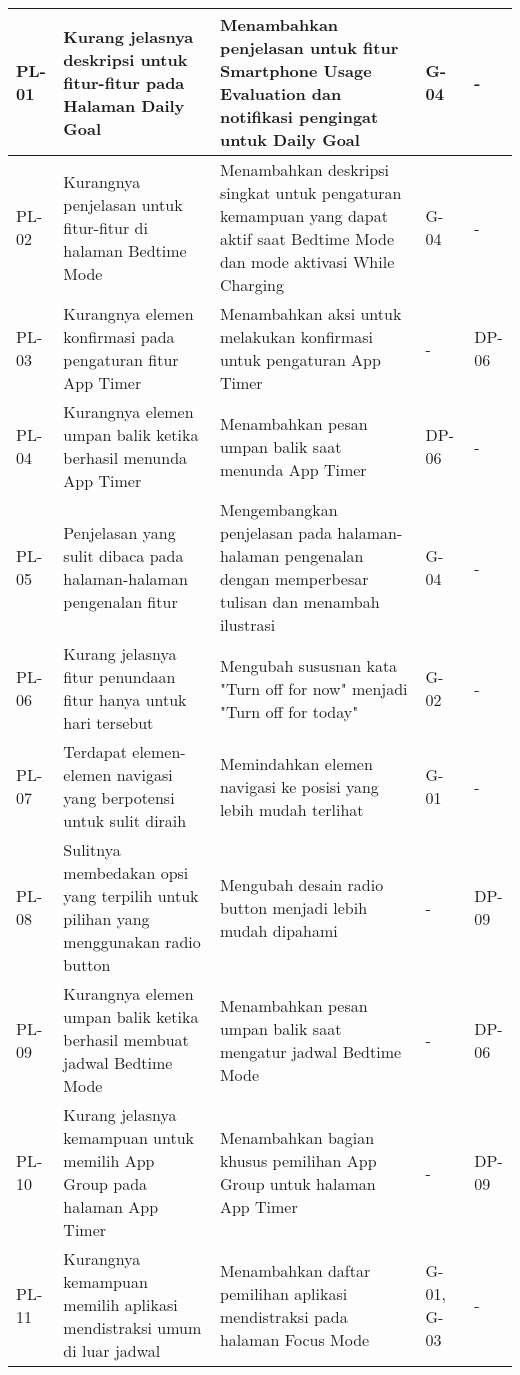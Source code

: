 \begin{footnotesize}
\begin{longtable}[c]{|W{c}{0.06\textwidth}|>{\ccnormspacing}m{0.31\textwidth}|>{\ccnormspacing}m{0.31\textwidth}|>{\ccnormspacingcenter}m{0.07\textwidth}|>{\ccnormspacingcenter}m{0.09\textwidth}|}
  PL-01 & Kurang jelasnya deskripsi untuk fitur-fitur pada Halaman Daily Goal & Menambahkan penjelasan untuk fitur Smartphone Usage Evaluation dan notifikasi pengingat untuk Daily Goal & G-04 & - \\ \hline
  PL-02 & Kurangnya penjelasan untuk fitur-fitur di halaman Bedtime Mode & Menambahkan deskripsi singkat untuk pengaturan kemampuan yang dapat aktif saat Bedtime Mode dan mode aktivasi While Charging & G-04 & - \\ \hline
  PL-03 & Kurangnya elemen konfirmasi pada pengaturan fitur App Timer & Menambahkan aksi untuk melakukan konfirmasi untuk pengaturan App Timer & - & DP-06 \\ \hline
  PL-04 & Kurangnya elemen umpan balik ketika berhasil menunda App Timer & Menambahkan pesan umpan balik saat menunda App Timer & DP-06 & - \\ \hline
  PL-05 & Penjelasan yang sulit dibaca pada halaman-halaman pengenalan fitur & Mengembangkan penjelasan pada halaman-halaman pengenalan dengan memperbesar tulisan dan menambah ilustrasi & G-04 & - \\ \hline
  PL-06 & Kurang jelasnya fitur penundaan fitur hanya untuk hari tersebut & Mengubah sususnan kata "Turn off for now" menjadi "Turn off for today" & G-02 & - \\ \hline
  PL-07 & Terdapat elemen-elemen navigasi yang berpotensi untuk sulit diraih & Memindahkan elemen navigasi ke posisi yang lebih mudah terlihat & G-01 & - \\ \hline
  PL-08 & Sulitnya membedakan opsi yang terpilih untuk pilihan yang menggunakan radio button & Mengubah desain radio button menjadi lebih mudah dipahami & - & DP-09 \\ \hline
  PL-09 & Kurangnya elemen umpan balik ketika berhasil membuat jadwal Bedtime Mode & Menambahkan pesan umpan balik saat mengatur jadwal Bedtime Mode & - & DP-06 \\ \hline
  PL-10 & Kurang jelasnya kemampuan untuk memilih App Group pada halaman App Timer & Menambahkan bagian khusus pemilihan App Group untuk halaman App Timer & - & DP-09 \\ \hline
  PL-11 & Kurangnya kemampuan memilih aplikasi mendistraksi umum di luar jadwal & Menambahkan daftar pemilihan aplikasi mendistraksi pada halaman Focus Mode & G-01, G-03 & - \\ \hline
  
\end{longtable}
\end{footnotesize}
\justifying
\FloatBarrier



